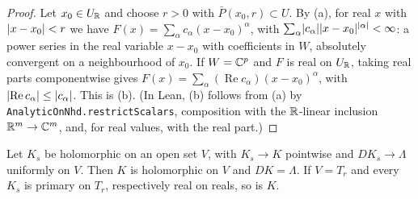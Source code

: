 \begin{proof}
\label{step:p1:han-real}
Let $x_0\in U_{\mathbb{R}}$ and choose $r>0$ with $\bar P(x_0,r)\subset U$. By (a), for real $x$ with
$\lvert x-x_0\rvert<r$ we have $F(x)=\sum_\alpha c_\alpha(x-x_0)^\alpha$, with
$\sum_\alpha\lvert c_\alpha\rvert\lvert x-x_0\rvert^{\lvert \alpha\rvert}<\infty$: a power series in the real variable
$x-x_0$ with coefficients in $W$, absolutely convergent on a neighbourhood of $x_0$. If $W=\mathbb{C}^p$ and $F$
is real on $U_{\mathbb{R}}$, taking real parts componentwise gives
$F(x)=\sum_\alpha(\operatorname{Re}c_\alpha)(x-x_0)^\alpha$, with $\lvert \operatorname{Re}c_\alpha\rvert\le
\lvert c_\alpha\rvert$. This is (b). (In Lean, (b) follows from (a) by
\nolinkurl{AnalyticOnNhd.restrictScalars}, composition with the $\mathbb{R}$-linear inclusion
$\mathbb{R}^m\to\mathbb{C}^m$, and, for real values, with the real part.)
\end{proof}

\begin{lemma}\label{bp:p1:uniform-limits}
Let $K_s$ be holomorphic on an open set $V$, with $K_s\to K$ pointwise and $DK_s\to\Lambda$ uniformly on
$V$. Then $K$ is holomorphic on $V$ and $DK=\Lambda$. If $V=T_r$ and every $K_s$ is primary on $T_r$,
respectively real on reals, so is $K$.
\end{lemma}

